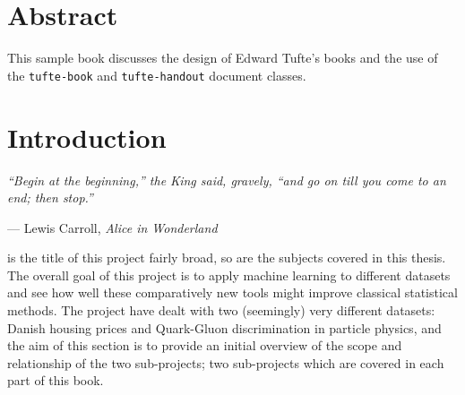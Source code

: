\documentclass[a4paper, twoside, nobib]{tufte-book}
\newcommand{\doccls}[1]{\texttt{#1}}%
\begin{document}
\tableofcontents

\listoffigures

\listoftables



\cleardoublepage
\chapter{Abstract}

This sample book discusses the design of Edward Tufte's books
and the use of the \doccls{tufte-book} and \doccls{tufte-handout} document classes.


\mainmatter

\chapter{Introduction}
\label{ch:introduction}
\epigraph{\textit{``Begin at the beginning,'' the King said, gravely, ``and go on till you
come to an end; then stop.''}}{--- Lewis Carroll, \textit{Alice in Wonderland}}


 
is the title of this project fairly broad, so are the subjects covered in this thesis. The overall goal of this project is to apply machine learning to different datasets and see how well these comparatively new tools might improve classical statistical methods. The project have dealt with two (seemingly) very different datasets: Danish housing prices and Quark-Gluon discrimination in particle physics, and the aim of this section is to provide an initial overview of the scope and relationship of the two sub-projects; two sub-projects which are covered in each part of this book. 
\end{document}
